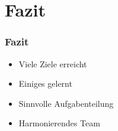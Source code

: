 \section{Fazit}
\begin{frame}
\frametitle{Fazit}

\begin{itemize}
	\item Viele Ziele erreicht
	\item Einiges gelernt
	\item Sinnvolle Aufgabenteilung
	\item Harmonierendes Team
\end{itemize}
\end{frame}   
